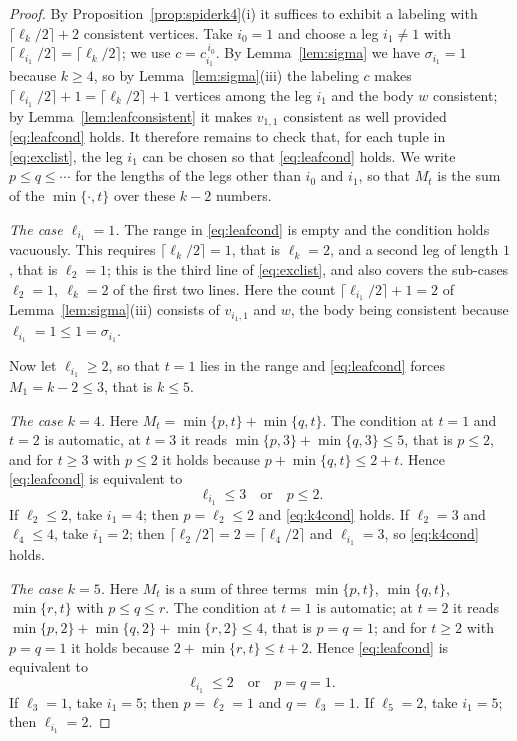 \documentclass[reqno,10pt]{article}
\theoremstyle{definition}
\numberwithin{equation}{section}
\numberwithin{theorem}{section}
\newcommand{\Ntwo}{M}
\begin{document}
\begin{proof}
By Proposition~\ref{prop:spiderk4}(i) it suffices to exhibit a labeling with
$\lceil \ell_k/2\rceil+2$ consistent vertices. Take $i_0=1$ and choose a leg
$i_1\ne1$ with $\lceil \ell_{i_1}/2\rceil=\lceil \ell_k/2\rceil$; we use
$c=c_{i_1}^{\,i_0}$. By Lemma~\ref{lem:sigma} we have $\sigma_{i_1}=1$ because
$k\ge4$, so by Lemma~\ref{lem:sigma}(iii) the labeling $c$ makes
$\lceil \ell_{i_1}/2\rceil+1=\lceil \ell_k/2\rceil+1$ vertices among the leg
$i_1$ and the body $w$ consistent; by Lemma~\ref{lem:leafconsistent} it makes
$v_{1,1}$ consistent as well provided \eqref{eq:leafcond} holds. It therefore
remains to check that, for each tuple in \eqref{eq:exclist}, the leg $i_1$ can be
chosen so that \eqref{eq:leafcond} holds. We write $p\le q\le\cdots$ for the
lengths of the legs other than $i_0$ and $i_1$, so that $\Ntwo_t$ is the sum of the
$\min\{\cdot,t\}$ over these $k-2$ numbers.

\smallskip
\noindent\emph{The case $\ell_{i_1}=1$.} The range in \eqref{eq:leafcond} is
empty and the condition holds vacuously. This requires
$\lceil \ell_k/2\rceil=1$, that is $\ell_k=2$, and a second leg of length $1$,
that is $\ell_2=1$; this is the third line of \eqref{eq:exclist}, and also
covers the sub-cases $\ell_2=1,\ \ell_k=2$ of the first two lines. Here the
count $\lceil \ell_{i_1}/2\rceil+1=2$ of Lemma~\ref{lem:sigma}(iii) consists of
$v_{i_1,1}$ and $w$, the body being consistent because
$\ell_{i_1}=1\le1=\sigma_{i_1}$.

\smallskip
\noindent Now let $\ell_{i_1}\ge2$, so that $t=1$ lies in the range and
\eqref{eq:leafcond} forces $\Ntwo_1=k-2\le3$, that is $k\le5$.

\smallskip
\noindent\emph{The case $k=4$.} Here $\Ntwo_t=\min\{p,t\}+\min\{q,t\}$. The
condition at $t=1$ and $t=2$ is automatic, at $t=3$ it reads
$\min\{p,3\}+\min\{q,3\}\le5$, that is $p\le2$, and for $t\ge3$ with $p\le2$ it
holds because $p+\min\{q,t\}\le2+t$. Hence \eqref{eq:leafcond} is equivalent to
\begin{equation}
  \ell_{i_1}\le3\quad\text{or}\quad p\le2 .
  \label{eq:k4cond}
\end{equation}
If $\ell_2\le2$, take $i_1=4$; then $p=\ell_2\le2$ and \eqref{eq:k4cond} holds.
If $\ell_2=3$ and $\ell_4\le4$, take $i_1=2$; then
$\lceil \ell_2/2\rceil=2=\lceil \ell_4/2\rceil$ and $\ell_{i_1}=3$, so
\eqref{eq:k4cond} holds.

\smallskip
\noindent\emph{The case $k=5$.} Here $\Ntwo_t$ is a sum of three terms
$\min\{p,t\}$, $\min\{q,t\}$, $\min\{r,t\}$ with $p\le q\le r$. The condition
at $t=1$ is automatic; at $t=2$ it reads
$\min\{p,2\}+\min\{q,2\}+\min\{r,2\}\le4$, that is $p=q=1$; and for $t\ge2$ with
$p=q=1$ it holds because $2+\min\{r,t\}\le t+2$. Hence \eqref{eq:leafcond} is
equivalent to
\begin{equation}
  \ell_{i_1}\le2\quad\text{or}\quad p=q=1 .
  \label{eq:k5cond}
\end{equation}
If $\ell_3=1$, take $i_1=5$; then $p=\ell_2=1$ and $q=\ell_3=1$. If
$\ell_5=2$, take $i_1=5$; then $\ell_{i_1}=2$.
\end{proof}
\end{document}
